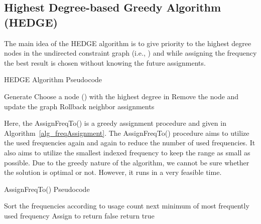 \documentclass[10pt,twocolumn,twoside]{JCNtran}
\begin{document}
\subsection{Highest Degree-based Greedy Algorithm (HEDGE)}
\label{subsec_hedge}
The main idea of the HEDGE algorithm is to give priority to the highest degree nodes in the undirected constraint graph (i.e., ) and while assigning the frequency the best result is chosen without knowing the future assignments. 
\begin{algorithm}
\caption{HEDGE Algorithm Pseudocode}
\begin{algorithmic}[1]
\REQUIRE 
\STATE Generate  
	\STATE Choose a node () with the highest degree in 
		\STATE Remove the node and update the graph 
	\ELSE
		\STATE Rollback neighbor assignments
	\ENDIF
\ENDWHILE
\end{algorithmic}
\end{algorithm}
Here, the AssignFreqTo() is a greedy assignment procedure and given in Algorithm~\ref{alg_freqAssignment}. The AssignFreqTo() procedure aims to utilize the used frequencies again and again to reduce the number of used frequencies. It also aims to utilize the smallest indexed frequency to keep the range as small as possible. Due to the greedy nature of the algorithm, we cannot be sure whether the solution is optimal or not. However, it runs in a very feasible time. 

\begin{algorithm}
\caption{AssignFreqTo() Pseudocode}
\begin{algorithmic}[1]
\REQUIRE 
\STATE Sort the frequencies according to usage count
\STATE  next minimum of most frequently used frequency 
	\STATE Assign  to 
\ENDIF
\ENDFOR
{}
	\STATE return false
\ELSE
	\STATE return true
\ENDIF
\end{algorithmic}
\label{alg_freqAssignment}
\end{algorithm}
\end{document}
